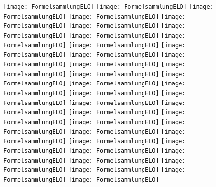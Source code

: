 \texttt{[image: FormelsammlungELO]}\newpage
\texttt{[image: FormelsammlungELO]}\newpage
\texttt{[image: FormelsammlungELO]}\newpage
\texttt{[image: FormelsammlungELO]}\newpage
\texttt{[image: FormelsammlungELO]}\newpage
\texttt{[image: FormelsammlungELO]}\newpage
\texttt{[image: FormelsammlungELO]}\newpage
\texttt{[image: FormelsammlungELO]}\newpage
\texttt{[image: FormelsammlungELO]}\newpage
\texttt{[image: FormelsammlungELO]}\newpage
\texttt{[image: FormelsammlungELO]}\newpage
\texttt{[image: FormelsammlungELO]}\newpage
\texttt{[image: FormelsammlungELO]}\newpage
\texttt{[image: FormelsammlungELO]}\newpage
\texttt{[image: FormelsammlungELO]}\newpage
\texttt{[image: FormelsammlungELO]}\newpage
\texttt{[image: FormelsammlungELO]}\newpage
\texttt{[image: FormelsammlungELO]}\newpage
\texttt{[image: FormelsammlungELO]}\newpage
\texttt{[image: FormelsammlungELO]}\newpage
\texttt{[image: FormelsammlungELO]}\newpage
\texttt{[image: FormelsammlungELO]}\newpage
\texttt{[image: FormelsammlungELO]}\newpage
\texttt{[image: FormelsammlungELO]}\newpage
\texttt{[image: FormelsammlungELO]}\newpage
\texttt{[image: FormelsammlungELO]}\newpage
\texttt{[image: FormelsammlungELO]}\newpage
\texttt{[image: FormelsammlungELO]}\newpage
\texttt{[image: FormelsammlungELO]}\newpage
\texttt{[image: FormelsammlungELO]}\newpage
\texttt{[image: FormelsammlungELO]}\newpage
\texttt{[image: FormelsammlungELO]}\newpage
\texttt{[image: FormelsammlungELO]}\newpage
\texttt{[image: FormelsammlungELO]}\newpage
\texttt{[image: FormelsammlungELO]}\newpage
\texttt{[image: FormelsammlungELO]}\newpage
\texttt{[image: FormelsammlungELO]}\newpage
\texttt{[image: FormelsammlungELO]}\newpage
